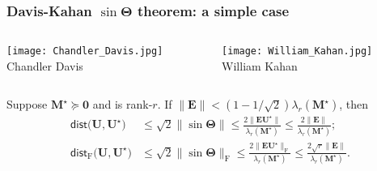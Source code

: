 \documentclass[compress,
mathserif,wide,%
]{beamer}
\begin{document}
\begin{frame}
\frametitle{Davis-Kahan $\sin\bm{\Theta}$ theorem: a simple case}

\vspace{-0.5em}

\begin{columns}
	\begin{column}{0.35\textwidth}
		\begin{center}
			\texttt{[image: Chandler\_Davis.jpg]} \\
			{\footnotesize  Chandler Davis}
		\end{center}
	\end{column}
	\begin{column}{0.35\textwidth}
		\begin{center}
			\texttt{[image: William\_Kahan.jpg]} \\
			{\footnotesize William Kahan}
		\end{center}
	\end{column}


\end{columns}

\begin{theorem} \label{thm:sin-Theta}
Suppose $\bm{M}^\star \succeq \bm{0}$ and is rank-$r$. If $\|\bm{E}\| < (1 - 1/ \sqrt{2}) \lambda_{r}(\bm{M}^\star)$, then
\begin{subequations}
\label{eq:davis-kahan-conclusion-corollary}
\begin{align*}
\mathsf{dist}\big(\bm{U},\bm{U}^{\star}\big) & \leq\sqrt{2}\|\sin\bm{\Theta}\|\leq\frac{2 \big\|\bm{E}\bm{U}^{\star}\big\|}{\lambda_{r}(\bm{M}^\star)}\leq\frac{2\|\bm{E}\|}{\lambda_{r}(\bm{M}^\star)};\\
	\mathsf{dist}_{\mathrm{F}}\big(\bm{U},\bm{U}^{\star}\big) & \leq\sqrt{2}\|\sin\bm{\Theta}\|_{\mathrm{F}}\leq\frac{2 \big\|\bm{E}\bm{U}^{\star}\big\|_{\mathrm{F}}}{\lambda_{r}(\bm{M}^\star)}\leq\frac{2\sqrt{r}\|\bm{E}\|}{\lambda_{r}(\bm{M}^\star)}.
\end{align*}
\end{subequations}
%
\end{theorem}

\end{frame}
\end{document}

